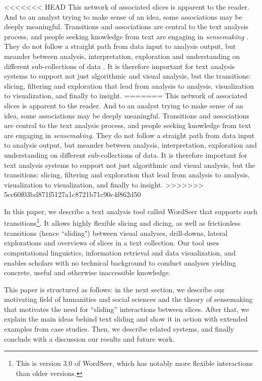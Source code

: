 \documentclass{sig-alternate}
\begin{document}
<<<<<<< HEAD
This network of associated slices is apparent to the reader. And to an analyst trying to make sense of an idea, some associations may be deeply meaningful.  Transitions  and associations are central to the text analysis process, and people seeking knowledge from text are engaging in \emph{sensemaking} \cite{}. They do not follow a straight path from data input to analysis output, but meander between analysis, interpretation, exploration and understanding on different sub-collections of data \cite{}.  It is therefore important for text analysis systems to support not just algorithmic and visual analysis, but the transitions: slicing, filtering and exploration that lead from analysis to analysis, visualization to visualization, and finally to insight.
=======
This network of associated slices is apparent to the reader. And to an analyst trying to make sense of an idea, some associations may be deeply meaningful.  Transitions  and associations are central to the text analysis process, and people seeking knowledge from text are engaging in \emph{sensemaking}\cite{russell_cost_1993, russell_being_2006, pirolli_sensemaking_2005}. They do not follow a straight path from data input to analysis output, but meander between analysis, interpretation, exploration and understanding on different sub-collections of data.  It is therefore important for text analysis systems to support not just algorithmic and visual analysis, but the transitions: slicing, filtering and exploration that lead from analysis to analysis, visualization to visualization, and finally to insight.
>>>>>>> 5cc60f03bd871f5127a1c8721b71c90c4f862d50

In this paper, we describe a text analysis tool called WordSeer that supports such transitions\footnote{This is version 3.0 of WordSeer, which has notably more flexible interactions than older versions.}.  It allows highly flexible slicing and dicing, as well as frictionless transitions (hence ``sliding") between visual analyses, drill-downs, lateral explorations and overviews of slices in a text collection. Our tool uses computational linguistics, information retrieval and data visualization, and enables scholars with no technical background to conduct analyses yielding concrete, useful and otherwise inaccessible knowledge. 

This paper is structured as follows: in the next section, we describe our motivating field of humanities and social sciences and the theory of sensemaking that motivates the need for ``sliding'' interactions between slices. After that, we explain the main ideas behind text sliding and show it in action with extended examples from case studies. Then, we describe related systems, and finally conclude with a discussion our results and future work.
\end{document}
